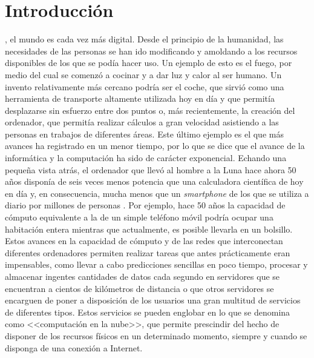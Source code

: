 \chapter{Introducción}
\label{chap:introduccion}

, el mundo es cada vez más digital. Desde el principio de la humanidad, las necesidades de las personas se han ido modificando y amoldando a los recursos disponibles de los que se podía hacer uso. Un ejemplo de esto es el fuego, por medio del cual se comenzó a cocinar y a dar luz y calor al ser humano. Un invento relativamente más cercano podría ser el coche, que sirvió como una herramienta de transporte altamente utilizada hoy en día y que permitía desplazarse sin esfuerzo entre dos puntos o, más recientemente, la creación del ordenador, que permitía realizar cálculos a gran velocidad asistiendo a las personas en trabajos de diferentes áreas. Este último ejemplo es el que más avances ha registrado en un menor tiempo, por lo que se dice que el avance de la informática y la computación ha sido de carácter exponencial. Echando una pequeña vista atrás, el ordenador que llevó al hombre a la Luna hace ahora 50 años disponía de seis veces menos potencia que una calculadora científica de hoy en día y, en consecuencia, mucha menos que un \textit{smartphone} de los que se utiliza a diario por millones de personas \cite{lacaixa2017}. Por ejemplo, hace 50 años la capacidad de cómputo equivalente a la de un simple teléfono móvil podría ocupar una habitación entera mientras que actualmente, es posible llevarla en un bolsillo. Estos avances en la capacidad de cómputo y de las redes que interconectan diferentes ordenadores permiten realizar tareas que antes prácticamente eran impensables, como llevar a cabo predicciones sencillas en poco tiempo, procesar y almacenar ingentes cantidades de datos cada segundo en servidores que se encuentran a cientos de kilómetros de distancia o que otros servidores se encarguen de poner a disposición de los usuarios una gran multitud de servicios de diferentes tipos. Estos servicios se pueden englobar en lo que se denomina como <<computación en la nube>>, que permite prescindir del hecho de disponer de los recursos físicos en un determinado momento, siempre y cuando se disponga de una conexión a Internet.

